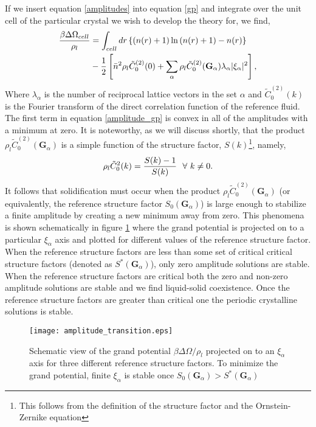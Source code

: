 If we insert equation \ref{amplitudes} into equation \ref{gp} and integrate
over the unit cell of the particular crystal we wish to develop the theory for,
we find,
%
\begin{align}
    \label{amplitude_gp} 
    \frac{\beta \Delta\Omega_{cell}}{\rho_l} &=  \int_{cell} 
        dr \left\lbrace (n(r) + 1)\ln\left(n(r) + 1\right) - n(r) \right\rbrace \nonumber \\
    &- \frac{1}{2} \left[\bar{n} ^ 2 \rho_l\tilde{C}^{(2)}_0(0) + \sum_\alpha\rho_l\tilde{C}^{(2)}_0
            (\mathbf{G}_\alpha) \lambda_\alpha\vert\xi_\alpha\vert^2\right],
\end{align}
%
Where $\lambda_\alpha$ is the number of reciprocal lattice vectors in the set
$\alpha$ and $\tilde{C}^{(2)}_0(k)$ is the Fourier transform of the direct
correlation function of the reference fluid. The first term in equation
\ref{amplitude_gp} is convex in all of the amplitudes with a minimum at zero.
It is noteworthy, as we will discuss shortly, that the product $\rho_l
\tilde{C}^{(2)}_0(\mathbf{G}_\alpha)$ is a simple function of the structure
factor, $S(k)$\footnote{This follows from the definition of the structure
factor and the Ornstein-Zernike equation}, namely,
%
\begin{equation}
    \rho_l \tilde{C}_0^2(k) = \frac{S(k) - 1}{S(k)}\,\,\,\,\forall \,\,k \ne 0.
\end{equation}
%
It follows that solidification must occur when the product $\rho_l
\tilde{C}^{(2)}_0(\mathbf{G}_\alpha)$ (or equivalently, the reference structure
factor $S_0(\mathbf{G}_\alpha)$) is large enough to stabilize a finite
amplitude by creating a new minimum away from zero.  This phenomena is shown
schematically in figure \ref{fig:amplitude_transition} where the grand
potential is projected on to a particular $\xi_\alpha$ axis and plotted for
different values of the reference structure factor. When the reference
structure factors are less than some set of critical critical structure factors 
(denoted as $S^*(\mathbf{G}_\alpha)$), only zero amplitude solutions are
stable.  When the reference structure factors are critical both the zero and
non-zero amplitude solutions are stable and we find liquid-solid coexistence.
Once the reference structure factors are greater than critical one the periodic
crystalline solutions is stable.
%
\begin{figure}
    \centering
    \texttt{[image: amplitude\_transition.eps]}
    \caption[Grand Potential through the Solidification transition]{ 
        Schematic view of the grand potential $\beta\Delta\Omega / \rho_l$
        projected on to an $\xi_\alpha$ axis for three different reference
        structure factors. To minimize the grand potential, finite $\xi_\alpha$
        is stable once $S_0(\mathbf{G}_\alpha) > S^*(\mathbf{G}_\alpha)$
    }\label{fig:amplitude_transition}
\end{figure}
